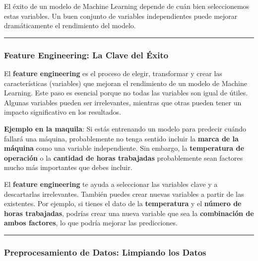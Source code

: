 \documentclass[
  10pt,
  letterpaper,
]{book}
\begin{document}
El éxito de un modelo de Machine Learning depende de cuán bien
seleccionemos estas variables. Un buen conjunto de variables
independientes puede mejorar dramáticamente el rendimiento del modelo.

\begin{center}\rule{0.5\linewidth}{0.5pt}\end{center}

\subsubsection{\texorpdfstring{\textbf{Feature Engineering: La Clave del
Éxito}}{Feature Engineering: La Clave del Éxito}}\label{feature-engineering-la-clave-del-uxe9xito}

El \textbf{feature engineering} es el proceso de elegir, transformar y
crear las características (variables) que mejoran el rendimiento de un
modelo de Machine Learning. Este paso es esencial porque no todas las
variables son igual de útiles. Algunas variables pueden ser
irrelevantes, mientras que otras pueden tener un impacto significativo
en los resultados.

\textbf{Ejemplo en la maquila}: Si estás entrenando un modelo para
predecir cuándo fallará una máquina, probablemente no tenga sentido
incluir la \textbf{marca de la máquina} como una variable independiente.
Sin embargo, la \textbf{temperatura de operación} o la \textbf{cantidad
de horas trabajadas} probablemente sean factores mucho más importantes
que debes incluir.

El \textbf{feature engineering} te ayuda a seleccionar las variables
clave y a descartarlas irrelevantes. También puedes crear nuevas
variables a partir de las existentes. Por ejemplo, si tienes el dato de
la \textbf{temperatura} y el \textbf{número de horas trabajadas},
podrías crear una nueva variable que sea la \textbf{combinación de ambos
factores}, lo que podría mejorar las predicciones.

\begin{center}\rule{0.5\linewidth}{0.5pt}\end{center}

\subsubsection{\texorpdfstring{\textbf{Preprocesamiento de Datos:
Limpiando los
Datos}}{Preprocesamiento de Datos: Limpiando los Datos}}\label{preprocesamiento-de-datos-limpiando-los-datos}
\end{document}
